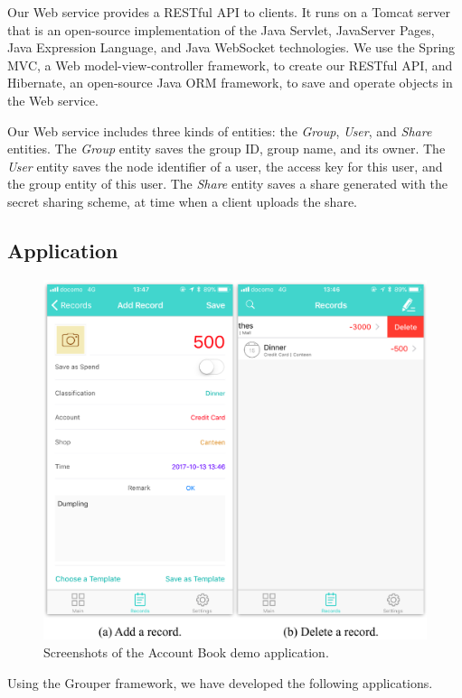 \documentclass{sig-alternate-05-2015}
\begin{document}
Our Web service provides a RESTful API to clients.
It runs on a Tomcat server\cite{tomcat} that is an open-source implementation of the Java Servlet, JavaServer Pages, Java Expression Language, and Java WebSocket technologies. 
We use the Spring MVC\cite{spring}, a Web model-view-controller framework, to create our RESTful API, and Hibernate\cite{hibernate}, an open-source Java ORM framework, to save and operate objects in the Web service. 

Our Web service includes three kinds of entities: the \emph{Group}, \emph{User}, and \emph{Share} entities. 
The \emph{Group} entity saves the group ID, group name, and its owner. 
The \emph{User} entity saves the node identifier of a user, the access key for this user, and the group entity of this user. 
The \emph{Share} entity saves a share generated with the secret sharing scheme, at time when a client uploads the share. 

\subsection{Application}

\begin{figure}[t]
	\centering
	\includegraphics[scale=0.48]{account_book}
	\caption{Screenshots of the Account Book demo application.}
\end{figure}

Using the Grouper framework, we have developed the following applications. 
\end{document}
